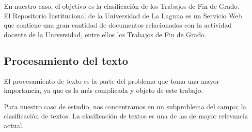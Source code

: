 En nuestro caso, el objetivo es la clasificación de los Trabajos de Fin de Grado. El Repositorio Institucional de la Universidad de La Laguna \cite{riull} es un Servicio Web que contiene una gran cantidad de documentos relacionados con la actividad docente de la Universidad, entre ellos los Trabajos de Fin de Grado.

\subsection{Procesamiento del texto}

El procesamiento de texto es la parte del problema que toma una mayor importancia, ya que es la más complicada y objeto de este trabajo.

Para nuestro caso de estudio, nos concentramos en un subproblema del campo; la clasificación de textos. La clasificación de textos es una de las de mayor relevancia actual.